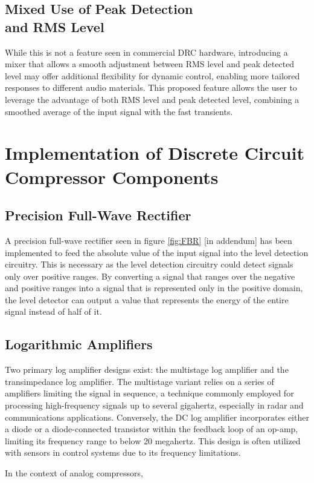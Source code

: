 \documentclass[10pt]{article}
\begin{document}
\begin{multicols*}{2}
            \subsection[Mixed Use of Peak Detection and RMS Level]{Mixed Use of Peak Detection\\and RMS Level}
                While this is not a feature seen in commercial DRC hardware, introducing a mixer that allows a smooth adjustment between RMS level and peak detected level may offer additional flexibility for dynamic control, enabling more tailored responses to different audio materials.
                This proposed feature allows the user to leverage the advantage of both RMS level and peak detected level, combining a smoothed average of the input signal with the fast transients.
            
        \section{Implementation of Discrete Circuit Compressor Components}

            \subsection{Precision Full-Wave Rectifier}
                A precision full-wave rectifier seen in figure \ref{fig:FBR} [in addendum] has been implemented to feed the absolute value of the input signal into the level detection circuitry. This is necessary as the level detection circuitry could detect signals only over positive ranges. By converting a signal that ranges over the negative and positive ranges into a signal that is represented only in the positive domain, the level detector can output a value that represents the energy of the entire signal instead of half of it.
                
            \subsection{Logarithmic Amplifiers} \label{sect:log-amp}
                Two primary log amplifier designs exist: the multistage log amplifier and the transimpedance log amplifier. The multistage variant relies on a series of amplifiers limiting the signal in sequence, a technique commonly employed for processing high-frequency signals up to several gigahertz, especially in radar and communications applications. Conversely, the DC log amplifier incorporates either a diode or a diode-connected transistor within the feedback loop of an op-amp, limiting its frequency range to below 20 megahertz. This design is often utilized with sensors in control systems due to its frequency limitations.\par
                In the context of analog compressors,  


\end{multicols*}
\end{document}
